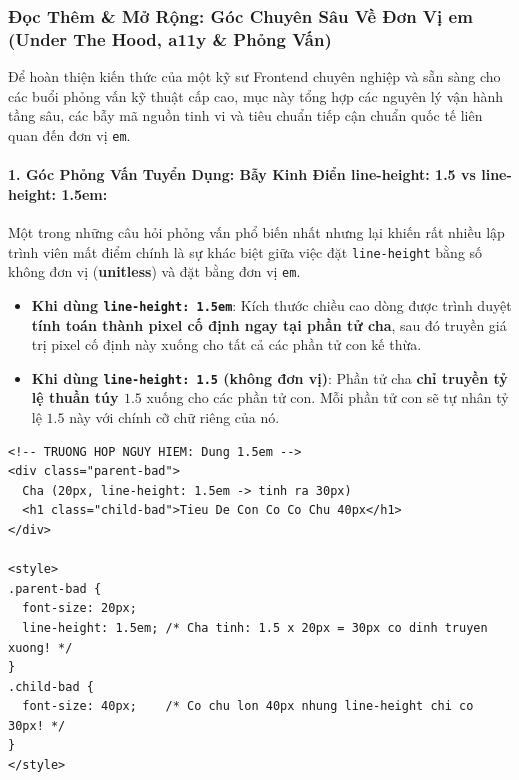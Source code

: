 \documentclass[11pt,oneside]{book}
\newcommand{\codeinline}[1]{\textcolor{accentOrange}{\texttt{#1}}}
\newcommand{\term}[1]{\textbf{\textcolor{primaryBlue}{#1}}}
\begin{document}
\subsubsection{Đọc Thêm \& Mở Rộng: Góc Chuyên Sâu Về Đơn Vị em (Under The Hood, a11y \& Phỏng Vấn)}

Để hoàn thiện kiến thức của một kỹ sư Frontend chuyên nghiệp và sẵn sàng cho các buổi phỏng vấn kỹ thuật cấp cao, mục này tổng hợp các nguyên lý vận hành tầng sâu, các bẫy mã nguồn tinh vi và tiêu chuẩn tiếp cận chuẩn quốc tế liên quan đến đơn vị \codeinline{em}.

\paragraph{1. Góc Phỏng Vấn Tuyển Dụng: Bẫy Kinh Điển line-height: 1.5 vs line-height: 1.5em:}
Một trong những câu hỏi phỏng vấn phổ biến nhất nhưng lại khiến rất nhiều lập trình viên mất điểm chính là sự khác biệt giữa việc đặt \codeinline{line-height} bằng số không đơn vị (\term{unitless}) và đặt bằng đơn vị \codeinline{em}.

\begin{conceptBox}
\begin{itemize}[leftmargin=1.5em, itemsep=3pt, parsep=0pt]
    \item \textbf{Khi dùng \codeinline{line-height: 1.5em}}: Kích thước chiều cao dòng được trình duyệt \textbf{tính toán thành pixel cố định ngay tại phần tử cha}, sau đó truyền giá trị pixel cố định này xuống cho tất cả các phần tử con kế thừa.
    \item \textbf{Khi dùng \codeinline{line-height: 1.5} (không đơn vị)}: Phần tử cha \textbf{chỉ truyền tỷ lệ thuần túy $1.5$} xuống cho các phần tử con. Mỗi phần tử con sẽ tự nhân tỷ lệ $1.5$ này với chính cỡ chữ riêng của nó.
\end{itemize}
\end{conceptBox}

\begin{codeWindow}
\begin{lstlisting}[language=HTML5]
<!-- TRUONG HOP NGUY HIEM: Dung 1.5em -->
<div class="parent-bad">
  Cha (20px, line-height: 1.5em -> tinh ra 30px)
  <h1 class="child-bad">Tieu De Con Co Co Chu 40px</h1>
</div>

<style>
.parent-bad {
  font-size: 20px;
  line-height: 1.5em; /* Cha tinh: 1.5 x 20px = 30px co dinh truyen xuong! */
}
.child-bad {
  font-size: 40px;    /* Co chu lon 40px nhung line-height chi co 30px! */
}
</style>
\end{lstlisting}
\end{codeWindow}
\end{document}
